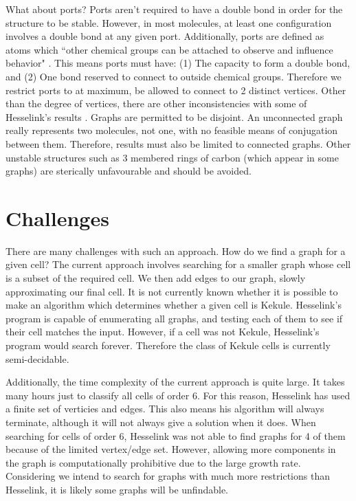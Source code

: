 \documentclass[12pt]{article}
\begin{document}
What about ports? Ports aren't required to have a double bond in order for the structure to be stable. However, in most molecules, at least one configuration involves a double bond at any given port. Additionally, ports are defined as atoms which ``other chemical groups can be attached to observe and influence behavior" \cite{H13}. This means ports must have: (1) The capacity to form a double bond, and (2) One bond reserved to connect to outside chemical groups. Therefore we restrict ports to at maximum, be allowed to connect to 2 distinct vertices. 
Other than the degree of vertices, there are other inconsistencies with some of Hesselink’s  results \cite{H13}. Graphs are permitted to be disjoint. An unconnected graph really represents two molecules, not one, with no feasible means of conjugation between them. Therefore, results must also be limited to connected graphs. Other unstable structures such as  3 membered rings of carbon (which appear in some graphs) are sterically unfavourable and should be avoided.

\section{Challenges}

There are many challenges with such an approach. How do we find a graph for a given cell? The current approach involves searching for a smaller graph whose cell is a subset of the required cell. We then add edges to our graph, slowly approximating our final cell. It is not currently known whether it is possible to make an algorithm which determines whether a given cell is Kekule. Hesselink's \cite{H13} program is capable of enumerating all graphs, and testing each of them to see if their cell matches the input. However, if a cell was not Kekule, Hesselink's program would search forever. Therefore the class of Kekule cells is currently semi-decidable.

Additionally, the time complexity of the current approach is quite large. It takes many hours just to classify all cells of order 6. For this reason, Hesselink has used a finite set of verticies and edges. This also means his algorithm will always terminate, although it will not always give a solution when it does. When searching for cells of order 6, Hesselink was not able to find graphs for 4 of them because of the limited vertex/edge set. However, allowing more components in the graph is computationally prohibitive due to the large growth rate. Considering we intend to search for graphs with much more restrictions than Hesselink, it is likely some graphs will be unfindable.
\end{document}
